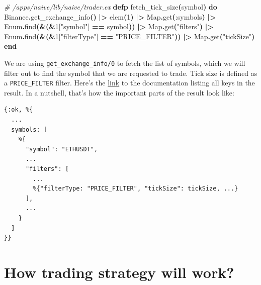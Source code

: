 \documentclass[
  oneside]{book}
\newenvironment{Shaded}{\begin{snugshade}}{\end{snugshade}}
\newcommand{\CommentTok}[1]{\textcolor[rgb]{0.56,0.35,0.01}{\textit{#1}}}
\newcommand{\ConstantTok}[1]{\textcolor[rgb]{0.56,0.35,0.01}{#1}}
\newcommand{\DecValTok}[1]{\textcolor[rgb]{0.00,0.00,0.81}{#1}}
\newcommand{\FunctionTok}[1]{\textcolor[rgb]{0.13,0.29,0.53}{\textbf{#1}}}
\newcommand{\KeywordTok}[1]{\textcolor[rgb]{0.13,0.29,0.53}{\textbf{#1}}}
\newcommand{\NormalTok}[1]{#1}
\newcommand{\OperatorTok}[1]{\textcolor[rgb]{0.81,0.36,0.00}{\textbf{#1}}}
\newcommand{\OtherTok}[1]{\textcolor[rgb]{0.56,0.35,0.01}{#1}}
\newcommand{\StringTok}[1]{\textcolor[rgb]{0.31,0.60,0.02}{#1}}
\newcommand{\VariableTok}[1]{\textcolor[rgb]{0.00,0.00,0.00}{#1}}
\begin{document}
\begin{Shaded}
\begin{Highlighting}[]
  \CommentTok{\# /apps/naive/lib/naive/trader.ex}
  \KeywordTok{defp}\NormalTok{ fetch\_tick\_size}\FunctionTok{(}\NormalTok{symbol}\FunctionTok{)} \KeywordTok{do}
    \ConstantTok{Binance}\OperatorTok{.}\NormalTok{get\_exchange\_info}\FunctionTok{()}
    \OperatorTok{|\textgreater{}}\NormalTok{ elem}\FunctionTok{(}\DecValTok{1}\FunctionTok{)}
    \OperatorTok{|\textgreater{}} \ConstantTok{Map}\OperatorTok{.}\NormalTok{get}\FunctionTok{(}\VariableTok{:symbols}\FunctionTok{)}
    \OperatorTok{|\textgreater{}} \ConstantTok{Enum}\OperatorTok{.}\NormalTok{find}\FunctionTok{(}\OperatorTok{\&}\FunctionTok{(}\OperatorTok{\&}\DecValTok{1}\OtherTok{[}\StringTok{"symbol"}\OtherTok{]} \OperatorTok{==}\NormalTok{ symbol}\FunctionTok{))}
    \OperatorTok{|\textgreater{}} \ConstantTok{Map}\OperatorTok{.}\NormalTok{get}\FunctionTok{(}\StringTok{"filters"}\FunctionTok{)}
    \OperatorTok{|\textgreater{}} \ConstantTok{Enum}\OperatorTok{.}\NormalTok{find}\FunctionTok{(}\OperatorTok{\&}\FunctionTok{(}\OperatorTok{\&}\DecValTok{1}\OtherTok{[}\StringTok{"filterType"}\OtherTok{]} \OperatorTok{==} \StringTok{"PRICE\_FILTER"}\FunctionTok{))}
    \OperatorTok{|\textgreater{}} \ConstantTok{Map}\OperatorTok{.}\NormalTok{get}\FunctionTok{(}\StringTok{"tickSize"}\FunctionTok{)}
  \KeywordTok{end}
\end{Highlighting}
\end{Shaded}

We are using \texttt{get\_exchange\_info/0} to fetch the list of symbols, which we will filter out to find the symbol that we are requested to trade. Tick size is defined as a \texttt{PRICE\_FILTER} filter. Here's the \href{https://github.com/binance/binance-spot-api-docs/blob/master/rest-api.md\#exchange-information}{link} to the documentation listing all keys in the result. In a nutshell, that's how the important parts of the result look like:

\begin{verbatim}
{:ok, %{
  ...
  symbols: [
    %{
      "symbol": "ETHUSDT",
      ...
      "filters": [
        ...
        %{"filterType: "PRICE_FILTER", "tickSize": tickSize, ...}
      ],
      ...
    }
  ]
}}
\end{verbatim}

\newpage

\section{How trading strategy will work?}\label{how-trading-strategy-will-work}
\end{document}

